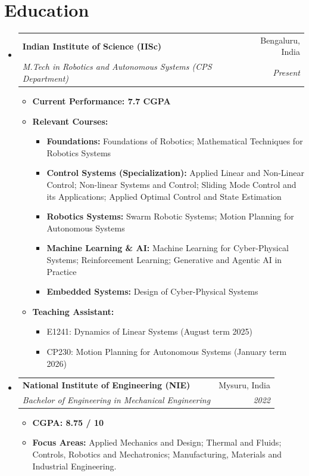 \documentclass[a4paper,10pt]{article}
\makeatletter
\newcommand{\resumeSubheading}[4]{
	\vspace{4pt}\item
	\begin{tabular*}{0.99\textwidth}[t]{l@{\extracolsep{\fill}}r}
		\textbf{#1} & #2 \\
		\textit{\small#3} & \textit{\small #4} \\
	\end{tabular*}\vspace{3pt}
}
\makeatother
\begin{document}
	\section{Education}
	\begin{itemize}[leftmargin=0.15in, label={}]
		\resumeSubheading
		{Indian Institute of Science (IISc)}{Bengaluru, India}
		{M.Tech in Robotics and Autonomous Systems (CPS Department)}{Present}
		\begin{itemize}
			\item \textbf{Current Performance: 7.7 CGPA}
			\item \textbf{Relevant Courses:}
			\begin{itemize}
				\item \textbf{Foundations:}
				Foundations of Robotics; Mathematical Techniques for Robotics Systems
				\item \textbf{Control Systems (Specialization):}
				Applied Linear and Non-Linear Control; Non-linear Systems and Control; Sliding Mode Control and its Applications; Applied Optimal Control and State Estimation
				\item \textbf{Robotics Systems:}
				Swarm Robotic Systems; Motion Planning for Autonomous Systems
				\item \textbf{Machine Learning \& AI:}
				Machine Learning for Cyber-Physical Systems; Reinforcement Learning; Generative and Agentic AI in Practice
				\item \textbf{Embedded Systems:}
				Design of Cyber-Physical Systems
			\end{itemize}
			\item \textbf{Teaching Assistant:}
			\begin{itemize}
				\item E1241: Dynamics of Linear Systems (August term 2025)
				\item CP230: Motion Planning for Autonomous Systems (January term 2026)
			\end{itemize}
		\end{itemize}
		
		\resumeSubheading
		{National Institute of Engineering (NIE)}{Mysuru, India}
		{Bachelor of Engineering in Mechanical Engineering}{2022}
		\begin{itemize}
			\item \textbf{CGPA: 8.75 / 10}
			\item \textbf{Focus Areas:} Applied Mechanics and Design; Thermal and Fluids; Controls, Robotics and Mechatronics; Manufacturing, Materials and Industrial Engineering.
		\end{itemize}
		

\end{itemize}
\end{document}
